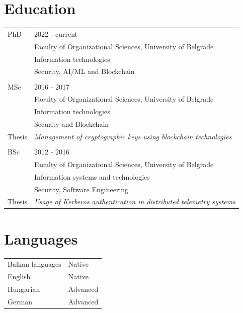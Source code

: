 \documentclass[a4paper]{article}
\begin{document}
\section{Education}
\begin{tabular}{@{}l | l}
    PhD    & 2022 - current                                                           \\
           & Faculty of Organizational Sciences, University of Belgrade               \\
           & Information technologies                                                 \\
           & Security, AI/ML and Blockchain                                           \\
           &                                                                          \\
    MSc    & 2016 - 2017                                                              \\
           & Faculty of Organizational Sciences, University of Belgrade               \\
           & Information technologies                                                 \\
           & Security and Blockchain                                                  \\
    Thesis & \emph{Management of cryptographic keys using blockchain technologies}    \\
           &                                                                          \\
    BSc    & 2012 - 2016                                                              \\
           & Faculty of Organizational Sciences, University of Belgrade               \\
           & Information systems and technologies                                     \\
           & Security, Software Engineering                                           \\
    Thesis & \emph{Usage of Kerberos authentication in distributed telemetry systems}
\end{tabular}

\section{Languages}
\begin{tabular}{@{}l | l}
    Balkan languages & Native   \\
    English          & Native   \\
    Hungarian        & Advanced \\
    German           & Advanced \\
\end{tabular}
\end{document}
